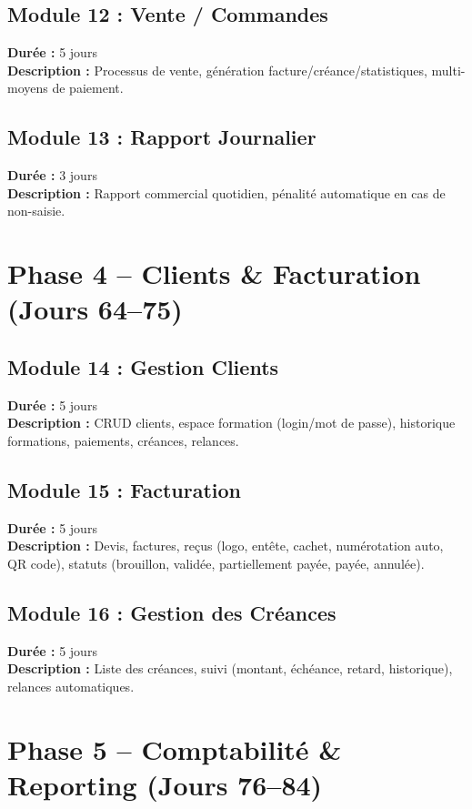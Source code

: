 \documentclass[12pt,a4paper]{report}
\begin{document}
\subsection*{Module 12 : Vente / Commandes}
\textbf{Durée :} 5 jours \\
\textbf{Description :} Processus de vente, génération facture/créance/statistiques, multi-moyens de paiement.

\subsection*{Module 13 : Rapport Journalier}
\textbf{Durée :} 3 jours \\
\textbf{Description :} Rapport commercial quotidien, pénalité automatique en cas de non-saisie.

\section{Phase 4 -- Clients \& Facturation (Jours 64--75)}
\label{sec:phase4}

\subsection*{Module 14 : Gestion Clients}
\textbf{Durée :} 5 jours \\
\textbf{Description :} CRUD clients, espace formation (login/mot de passe), historique formations, paiements, créances, relances.

\subsection*{Module 15 : Facturation}
\textbf{Durée :} 5 jours \\
\textbf{Description :} Devis, factures, reçus (logo, entête, cachet, numérotation auto, QR code), statuts (brouillon, validée, partiellement payée, payée, annulée).

\subsection*{Module 16 : Gestion des Créances}
\textbf{Durée :} 5 jours \\
\textbf{Description :} Liste des créances, suivi (montant, échéance, retard, historique), relances automatiques.

\section{Phase 5 -- Comptabilité \& Reporting (Jours 76--84)}
\label{sec:phase5}
\end{document}
